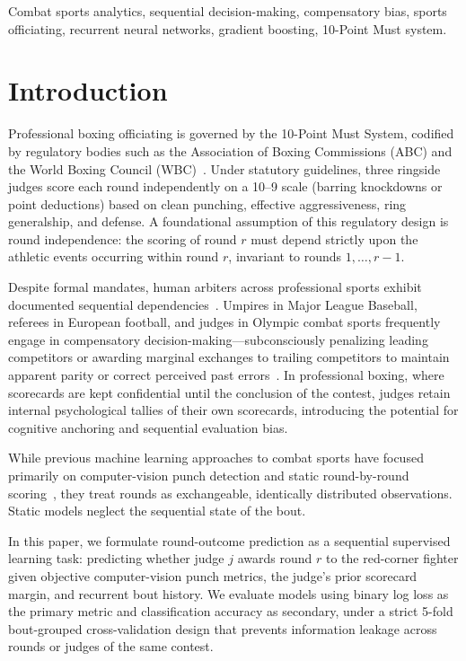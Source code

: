 \documentclass[conference]{IEEEtran}
\begin{document}
\begin{IEEEkeywords}
Combat sports analytics, sequential decision-making, compensatory bias, sports officiating, recurrent neural networks, gradient boosting, 10-Point Must system.
\end{IEEEkeywords}

\section{Introduction}
Professional boxing officiating is governed by the 10-Point Must System, codified by regulatory bodies such as the Association of Boxing Commissions (ABC) and the World Boxing Council (WBC)~\cite{abc2017,wbc2020}. Under statutory guidelines, three ringside judges score each round independently on a 10--9 scale (barring knockdowns or point deductions) based on clean punching, effective aggressiveness, ring generalship, and defense. A foundational assumption of this regulatory design is round independence: the scoring of round $r$ must depend strictly upon the athletic events occurring within round $r$, invariant to rounds $1, \dots, r-1$.

Despite formal mandates, human arbiters across professional sports exhibit documented sequential dependencies~\cite{garicano2005,dohmen2008,chen2016}. Umpires in Major League Baseball, referees in European football, and judges in Olympic combat sports frequently engage in compensatory decision-making---subconsciously penalizing leading competitors or awarding marginal exchanges to trailing competitors to maintain apparent parity or correct perceived past errors~\cite{peters2014,myers2006,moskowitz2012}. In professional boxing, where scorecards are kept confidential until the conclusion of the contest, judges retain internal psychological tallies of their own scorecards, introducing the potential for cognitive anchoring and sequential evaluation bias.

While previous machine learning approaches to combat sports have focused primarily on computer-vision punch detection and static round-by-round scoring~\cite{duboef2021,jabbr2023}, they treat rounds as exchangeable, identically distributed observations. Static models neglect the sequential state of the bout. 

In this paper, we formulate round-outcome prediction as a sequential supervised learning task: predicting whether judge $j$ awards round $r$ to the red-corner fighter given objective computer-vision punch metrics, the judge's prior scorecard margin, and recurrent bout history. We evaluate models using binary log loss as the primary metric and classification accuracy as secondary, under a strict 5-fold bout-grouped cross-validation design that prevents information leakage across rounds or judges of the same contest.
\end{document}

